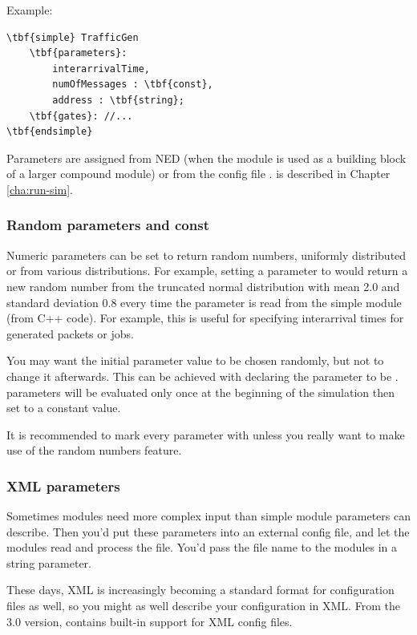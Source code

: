 Example:

\begin{Verbatim}[commandchars=\\\{\}]
\tbf{simple} TrafficGen
    \tbf{parameters}:
        interarrivalTime,
        numOfMessages : \tbf{const},
        address : \tbf{string};
    \tbf{gates}: //...
\tbf{endsimple}
\end{Verbatim}

Parameters are assigned from NED (when the module is used as a building block
of a larger compound module) or from the config file .
 is described in Chapter \ref{cha:run-sim}.


\subsubsection{Random parameters and const}
\label{sec:ch-ned-lang:const}

Numeric parameters can be set to return random numbers, uniformly
distributed or from various distributions. For example, setting a
parameter to  would return a new random number
from the truncated normal distribution with mean 2.0 and standard deviation 0.8
every time the parameter is read from the simple module (from C++ code).
For example, this is useful for specifying interarrival times for generated
packets or jobs.

You may want the initial parameter value to be chosen randomly, but not
to change it afterwards. This can be achieved with declaring the parameter
to be .  parameters will be evaluated only once
at the beginning of the simulation then set to a constant value.

It is recommended to mark every parameter with  unless
you really want to make use of the random numbers feature.


\subsubsection{XML parameters}

Sometimes modules need more complex input than simple module parameters
can describe. Then you'd put these parameters into an external config file,
and let the modules read and process the file. You'd pass the file name
to the modules in a string parameter.

These days, XML is increasingly becoming a standard format for configuration
files as well, so you might as well describe your configuration in XML.
From the 3.0 version, {\opp} contains built-in support for XML config files.

